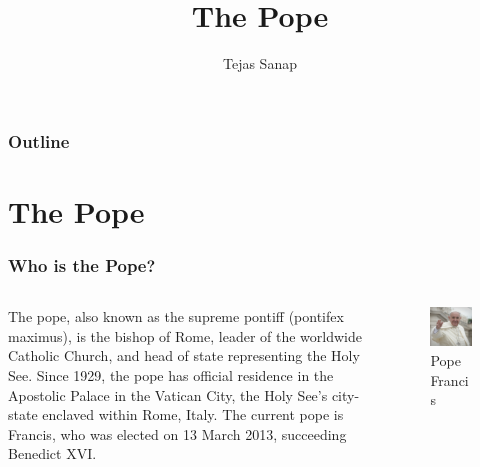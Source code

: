 \documentclass[hyperref=bookmarks]{beamer}
\title{The Pope}
\author{Tejas Sanap}
\begin{document}

	\begin{frame}
		\maketitle
	\end{frame}

	\begin{frame}
		\frametitle{Outline}
		\tableofcontents
	\end{frame}
	
	\section{The Pope}
	\begin{frame}
		\frametitle{Who is the Pope?}

		\begin{columns}[T]
			\begin{column}{0.5\textwidth}
				The pope, also known as the supreme pontiff (pontifex maximus), is the bishop of Rome, leader of the worldwide Catholic Church, and head of state representing the Holy See. Since 1929, the pope has official residence in the Apostolic Palace in the Vatican City, the Holy See's city-state enclaved within Rome, Italy. The current pope is Francis, who was elected on 13 March 2013, succeeding Benedict XVI.
			\end{column}
			\begin{column}{0.4\textwidth}
				\begin{figure}[h!]
					\centering
					\includegraphics[width=\textwidth, keepaspectratio]{images/the-pope.jpg}
					\caption{Pope Francis}
					\label{img:the-pope}
				\end{figure}
			\end{column}
		\end{columns}
	\end{frame}
\end{document}
